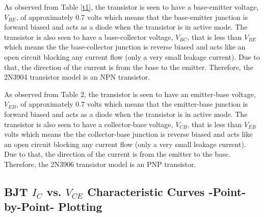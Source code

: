 \documentclass{article}
\begin{document}
	\noindent As observed from Table \ref{t1}, the transistor is seen to have a base-emitter voltage, $V_{BE}$, of approximately 0.7 volts which means that the base-emitter junction is forward biased and acts as a diode when the transistor is in active mode.
	The transistor is also seen to have a base-collector voltage, $V_{BC}$, that is less than $V_{BE}$ which means the the base-collector junction is reverse biased and acts like an open circuit blocking any current flow (only a very small leakage current).
	Due to that, the direction of the current is from the base to the emitter.
	Therefore, the 2N3904 transistor model is an NPN transistor.
	
	\pagebreak
		
	\noindent As observed from Table 2, the transistor is seen to have an emitter-base voltage, $V_{EB}$, of approximately 0.7 volts which means that the emitter-base junction is forward biased and acts as a diode when the transistor is in active mode.
	The transistor is also seen to have a collector-base voltage, $V_{CB}$, that is less than $V_{EB}$ volts which means the the collector-base junction is reverse biased and acts like an open circuit blocking any current flow (only a very small leakage current).
	Due to that, the direction of the current is from the emitter to the base.
	Therefore, the 2N3906 transistor model is an PNP transistor.
		
	\subsection{BJT $I_C$ vs. $V_{CE}$ Characteristic Curves -Point-by-Point- Plotting}
\end{document}
